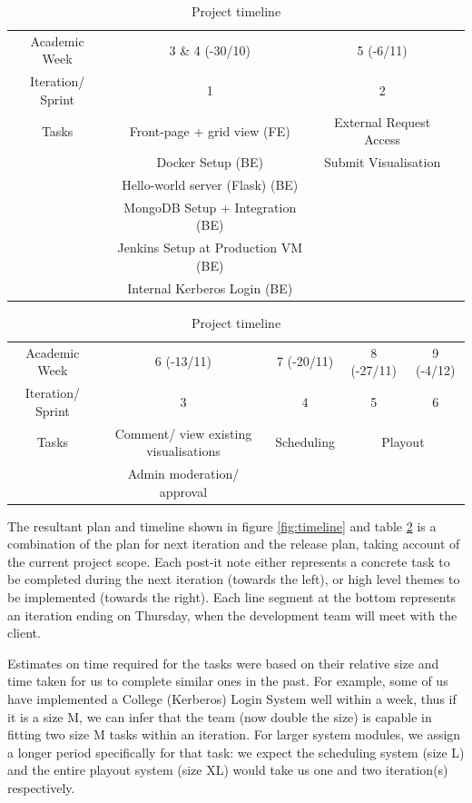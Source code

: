 \documentclass[a4paper]{article}
\begin{document}
\begin{table}[h]
  \begin{tabular}{c | c | c | c }
    Academic Week & 3 \& 4 (-30/10) & 5 (-6/11) \\
    Iteration/ Sprint & 1 & 2 \\ \hline
    Tasks & Front-page + grid view (FE) & External Request Access \\
          & Docker Setup (BE)           & Submit Visualisation \\
          & Hello-world server (Flask) (BE) & \\
          & MongoDB Setup + Integration (BE) & \\
          & Jenkins Setup at Production VM (BE) & \\
          & Internal Kerberos Login (BE) & \\
  \end{tabular}

  \vspace{10pt}
  \begin{tabular}{c | c | c | c | c}
    Academic Week & 6 (-13/11) & 7 (-20/11) & 8 (-27/11) & 9 (-4/12) \\
    Iteration/ Sprint & 3 & 4 & 5 & 6 \\ \hline
    Tasks & Comment/ view existing visualisations & Scheduling & 
            \multicolumn{2}{c}{Playout} \\
          & Admin moderation/ approval &  \\
  \end{tabular}
  \caption{Project timeline}
  \label{table:timeline}
\end{table}

The resultant plan and timeline shown in figure \ref{fig:timeline} and table
\ref{table:timeline} is a
combination of the plan for next iteration and the release plan, taking account
of the current project scope. Each post-it note either represents a 
concrete task to be completed during the next iteration (towards the left), or
high level themes to be implemented (towards the right). Each line segment at
the bottom represents an iteration ending on Thursday, when the development
team will meet with the client.

Estimates on time required for the tasks were based on their relative size and
time taken for us to complete similar ones in the past. For example, some of us
have implemented a College (Kerberos) Login System well within a week, thus if
it is a size M, we can infer that the team (now double the size) is capable in 
fitting two size M tasks within an iteration. For larger system modules, we
assign a longer period specifically for that task: we expect the scheduling
system (size L) and the entire playout system (size XL) would take us one and
two iteration(s) respectively.
\end{document}
